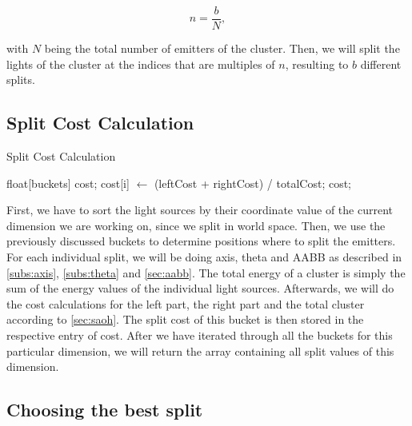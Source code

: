 \begin{equation}
n = \frac{b}{N},
\end{equation}

with $N$ being the total number of emitters of the cluster. Then, we will split the lights of the cluster at the indices that are multiples of $n$, resulting to $b$ different splits.

\subsection{Split Cost Calculation}
\label{subs:splitcost}

\begin{algorithm}
	\caption{Split Cost Calculation}
	\label{alg:splitcostcalculation}
	\begin{algorithmic}[1] %
		\State float[buckets] cost;
		\State <calculate axis, thetas, AABB and energy for the left part>
		\State <calculate axis, thetas, AABB and energy for the right part>
		\State <calculate leftCost, rightCost and totalCost>
		\State cost[i] $\gets$ (leftCost + rightCost) / totalCost;
		\EndFor
\State \Return cost;
\EndProcedure
\end{algorithmic}
\end{algorithm}

First, we have to sort the light sources by their coordinate value of the current dimension we are working on, since we split in world space. Then, we use the previously discussed buckets to determine positions where to split the emitters. For each individual split, we will be doing axis, theta and AABB as described in \ref{subs:axis}, \ref{subs:theta} and \ref{sec:aabb}. The total energy of a cluster is simply the sum of the energy values of the individual light sources. Afterwards, we will do the cost calculations for the left part, the right part and the total cluster according to \ref{sec:saoh}. The split cost of this bucket is then stored in the respective entry of cost. After we have iterated through all the buckets for this particular dimension, we will return the array containing all split values of this dimension.

\subsection{Choosing the best split}

